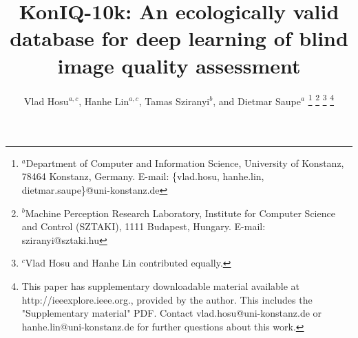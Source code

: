 \documentclass[10pt,journal,compsoc]{IEEEtran}
\begin{document}
\title{KonIQ-10k: An ecologically valid database for deep learning of blind image quality assessment}



\author{Vlad Hosu$^{a,c}$, Hanhe Lin$^{a,c}$, Tamas Sziranyi$^{b}$, and Dietmar Saupe$^a$
	\thanks{$^a$Department of Computer and Information Science, University of Konstanz, 78464 Konstanz, Germany.
E-mail: \{vlad.hosu, hanhe.lin, dietmar.saupe\}@uni-konstanz.de}
    \thanks{$^b$Machine Perception Research Laboratory, Institute for Computer Science and Control (SZTAKI), 1111 Budapest, Hungary.
E-mail: sziranyi@sztaki.hu}
	\thanks{$^c$Vlad Hosu and Hanhe Lin contributed equally.}
	\thanks{This paper has supplementary downloadable material available at http://ieeexplore.ieee.org., provided by the author. This includes the "Supplementary material" PDF. Contact vlad.hosu@uni-konstanz.de or hanhe.lin@uni-konstanz.de for further questions about this work.}
}






















\maketitle
\end{document}
